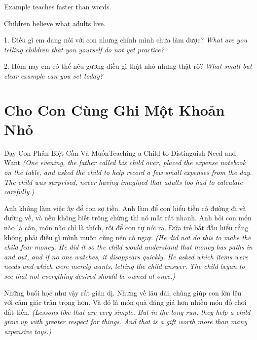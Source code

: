 \begin{ghinhoanh}
Example teaches faster than words.

Children believe what adults live.
\end{ghinhoanh}

\begin{tuhocnhanh}
1. Điều gì em đang nói với con nhưng chính mình chưa làm được? \textit{What are you telling children that you yourself do not yet practice?}

2. Hôm nay em có thể nêu gương điều gì thật nhỏ nhưng thật rõ? \textit{What small but clear example can you set today?}
\end{tuhocnhanh}
\ngancach

\section{Cho Con Cùng Ghi Một Khoản Nhỏ}
\begin{truyen}{Dạy Con Phân Biệt Cần Và Muốn}{Teaching a Child to Distinguish Need and Want}
\textit{(One evening, the father called his child over, placed the expense notebook on the table, and asked the child to help record a few small expenses from the day. The child was surprised, never having imagined that adults too had to calculate carefully.)}

Anh không làm việc ấy để con sợ tiền. Anh làm để con hiểu tiền có đường đi và đường về, và nếu không biết trông chừng thì nó mất rất nhanh. Anh hỏi con món nào là cần, món nào chỉ là thích, rồi để con tự nói ra. Đứa trẻ bắt đầu hiểu rằng không phải điều gì mình muốn cũng nên có ngay.
\textit{(He did not do this to make the child fear money. He did it so the child would understand that money has paths in and out, and if no one watches, it disappears quickly. He asked which items were needs and which were merely wants, letting the child answer. The child began to see that not everything desired should be owned at once.)}

Những buổi học như vậy rất giản dị. Nhưng về lâu dài, chúng giúp con lớn lên với cảm giác trân trọng hơn. Và đó là món quà đáng giá hơn nhiều món đồ chơi đắt tiền.
\textit{(Lessons like that are very simple. But in the long run, they help a child grow up with greater respect for things. And that is a gift worth more than many expensive toys.)}
\end{truyen}

